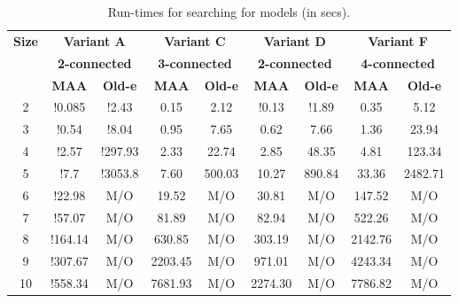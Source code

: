 \begin{table}[t]
  \centering
  \begin{tabular}[t]{|c|c|c|c|c|c|c|c|c|}\hline
  
    {\multirow{2}{*} {\textbf{Size}}}  & \multicolumn{2}{c|}{\textbf{Variant A}} & \multicolumn{2}{c|}{\textbf{Variant C}} & \multicolumn{2}{c|}{\textbf{Variant D}}  &  \multicolumn{2}{c|}{\textbf{Variant F}} \\\cline{2-9}
  
   {} & \multicolumn{2}{c|}{\textbf{2-connected} } & \multicolumn{2}{c|}{\textbf{3-connected} } & \multicolumn{2}{c|}{\textbf{2-connected}}  &  \multicolumn{2}{c|}{\textbf{4-connected}}
   \\\cline{2-9}
    {} & {\textbf{MAA}} & {\textbf{Old-e}} & {\textbf{MAA}} & {\textbf{Old-e}} & {\textbf{MAA}} & {\textbf{Old-e}} & {\textbf{MAA}} & {\textbf{Old-e}} \\\hline
    2 & !0.085 & !2.43 & 0.15 & 2.12 & !0.13 & !1.89 & 0.35 & 5.12 \\\hline
    3 & !0.54 & !8.04 & 0.95  & 7.65 & 0.62 & 7.66  & 1.36 & 23.94\\\hline
    4 & !2.57 & !297.93 & 2.33 & 22.74 & 2.85 & 48.35  & 4.81 & 123.34\\\hline
    5 & !7.7 & !3053.8 & 7.60 & 500.03 & 10.27 & 890.84 & 33.36  & 2482.71 \\\hline
    6 & !22.98 & M/O & 19.52 & M/O & 30.81 & M/O  & 147.52 & M/O\\\hline
    7 & !57.07 & M/O & 81.89 & M/O & 82.94 & M/O & 522.26  & M/O \\\hline
    8 & !164.14 & M/O & 630.85 & M/O & 303.19 & M/O & 2142.76 & M/O\\\hline
    9 & !307.67 & M/O & 2203.45 & M/O & 971.01 & M/O & 4243.34 & M/O\\\hline
    10 & !558.34 & M/O & 7681.93 & M/O & 2274.30 & M/O & 7786.82 & M/O\\\hline
  \end{tabular}
  \caption{Run-times for searching for models (in secs).}
  \label{tab:qf-grabh}
\end{table}

